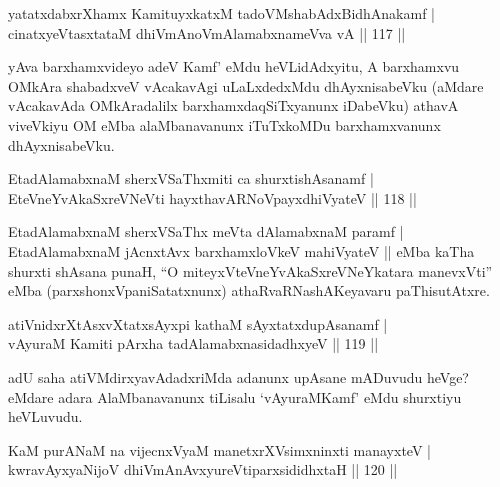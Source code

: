 
\begin{shl}
yatatxdabxrXhamx KamituyxkatxM tadoVMshabAdxBidhAnakamf  | \\
cinatxyeVtasxtataM dhiVmAnoVmAlamabxnameVva vA \hfill||  117 ||  
\end{shl}

\begin{artha}
yAva barxhamxvideyo adeV Kamf' eMdu heVLidAdxyitu, A barxhamxvu OMkAra shabadxveV vAcakavAgi uLaLxdedxMdu dhAyxnisabeVku (aMdare vAcakavAda OMkAradalilx barxhamxdaqSiTxyanunx iDabeVku) athavA viveVkiyu OM eMba alaMbanavanunx iTuTxkoMDu barxhamxvanunx dhAyxnisabeVku.
\end{artha}


\begin{shl}
EtadAlamabxnaM sherxVSaThxmiti ca shurxtishAsanamf  | \\
EteVneYvAkaSxreVNeVti hayxthavARNoV\s payxdhiVyateV \hfill||  118 ||  
\end{shl}

\begin{artha}
EtadAlamabxnaM sherxVSaThx meVta dAlamabxnaM paramf | EtadAlamabxnaM jAcnxtAvx barxhamxloVkeV mahiVyateV || eMba kaTha shurxti shAsana punaH, ``O miteyxVteVneYvAkaSxreVNeYkatara manevxVti'' eMba (parxshonxVpaniSatatxnunx) athaRvaRNashAKeyavaru paThisutAtxre.
\end{artha}


\begin{shl}
atiVnidxrXtAsxvXtatxsAyxpi kathaM sAyxtatxdupAsanamf   | \\
vAyuraM Kamiti pArxha tadAlamabxnasidadhxyeV \hfill||  119 ||  
\end{shl}

\begin{artha}
adU saha atiVMdirxyavAdadxriMda adanunx upAsane mADuvudu heVge? eMdare adara AlaMbanavanunx tiLisalu `vAyuraMKamf' eMdu shurxtiyu heVLuvudu.
\end{artha}


\begin{shl}
KaM purANaM na vijecnxVyaM manetxrXV\s simxninxti manayxteV  | \\
kwravAyxyaNijoV dhiVmAnAvxyureVtiparxsididhxtaH \hfill||  120 ||  
\end{shl}


